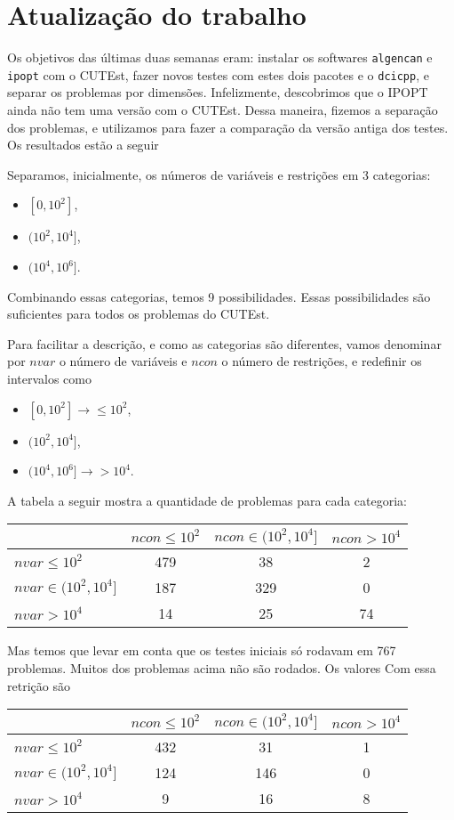 \documentclass{article}
\begin{document}
\section{Atualização do trabalho}

Os objetivos das últimas duas semanas eram: instalar os softwares \verb+algencan+ e
\verb+ipopt+ com o CUTEst, fazer novos testes com estes dois pacotes e o
\verb+dcicpp+, e separar os problemas por dimensões.
Infelizmente, descobrimos que o IPOPT ainda não tem uma versão com o CUTEst.
Dessa maneira, fizemos a separação dos problemas, e utilizamos para fazer a
comparação da versão antiga dos testes.
Os resultados estão a seguir

Separamos, inicialmente, os números de variáveis e restrições em 3 categorias:
\begin{itemize}
  \item $[0,10^2]$,
  \item $(10^2,10^4]$,
  \item $(10^4,10^6]$.
\end{itemize}
Combinando essas categorias, temos 9 possibilidades. Essas possibilidades são
suficientes para todos os problemas do CUTEst.

Para facilitar a descrição, e como as categorias são diferentes, vamos denominar
por $nvar$ o número de variáveis e $ncon$ o número de restrições, e
redefinir os intervalos como
\begin{itemize}
  \item $[0,10^2] \rightarrow \leq 10^2$,
  \item $(10^2,10^4]$,
  \item $(10^4,10^6] \rightarrow > 10^4$.
\end{itemize}

A tabela a seguir mostra a quantidade de problemas para cada categoria:
\begin{center}
\begin{tabular}{|l|c|c|c|} \hline
& $ncon \leq 10^2$ & $ncon \in (10^2,10^4]$ & $ncon > 10^4$ \\ \hline
$nvar \leq 10^2$       & 479 &  38 &  2 \\ \hline
$nvar \in (10^2,10^4]$ & 187 & 329 &  0 \\ \hline
$nvar > 10^4$          &  14 &  25 & 74 \\ \hline
\end{tabular}
\end{center}
Mas temos que levar em conta que os testes iniciais só rodavam em 767 problemas.
Muitos dos problemas acima não são rodados. Os valores Com essa retrição são
\begin{center}
\begin{tabular}{|l|c|c|c|} \hline
& $ncon \leq 10^2$ & $ncon \in (10^2,10^4]$ & $ncon > 10^4$ \\ \hline
$nvar \leq 10^2$       & 432 &  31 &  1 \\ \hline
$nvar \in (10^2,10^4]$ & 124 & 146 &  0 \\ \hline
$nvar > 10^4$          &   9 &  16 &  8 \\ \hline
\end{tabular}
\end{center}
\end{document}
